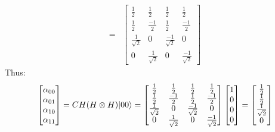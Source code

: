 \documentclass[11pt,a4paper]{article}
\begin{document}
\begin{enumerate}
\begin{enumerate}
\begin{align*}
                        = & \begin{bmatrix}
                                \frac{1}{2}        & \frac{1}{2}        & \frac{1}{2}         & \frac{1}{2}         \\
                                \frac{1}{2}        & \frac{-1}{2}       & \frac{1}{2}         & \frac{-1}{2}        \\
                                \frac{1}{\sqrt{2}} & 0                  & \frac{-1}{\sqrt{2}} & 0                   \\
                                0                  & \frac{1}{\sqrt{2}} & 0                   & \frac{-1}{\sqrt{2}}
                            \end{bmatrix}
                    \end{align*}
                    Thus:
                    \begin{align*}
                        \begin{bmatrix}
                            \alpha_{00} \\ \alpha_{01} \\ \alpha_{10} \\ \alpha_{11}
                        \end{bmatrix} =
                        CH(H \otimes H)|00\rangle
                        =  \begin{bmatrix}
                               \frac{1}{2}        & \frac{1}{2}        & \frac{1}{2}         & \frac{1}{2}         \\
                               \frac{1}{2}        & \frac{-1}{2}       & \frac{1}{2}         & \frac{-1}{2}        \\
                               \frac{1}{\sqrt{2}} & 0                  & \frac{-1}{\sqrt{2}} & 0                   \\
                               0                  & \frac{1}{\sqrt{2}} & 0                   & \frac{-1}{\sqrt{2}}
                           \end{bmatrix} \begin{bmatrix}
                                             1 \\ 0 \\ 0 \\ 0
                                         \end{bmatrix}
                        = \begin{bmatrix}
                              \frac{1}{2} \\ \frac{1}{2} \\ \frac{1}{\sqrt{2}} \\ 0

\end{bmatrix}
\end{align*}
\end{enumerate}
\end{enumerate}
\end{document}
